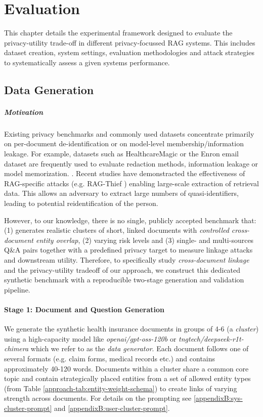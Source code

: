 \chapter{Evaluation}\label{chapter:evaluation}
This chapter details the experimental framework designed to evaluate the privacy-utility trade-off in different privacy-focussed \ac{RAG} systems. This includes dataset creation, system settings, evaluation methodologies and attack strategies to systematically assess a given systems performance.

\section{Data Generation}\label{evaluation-subsec:data-generation}
\paragraph{Motivation}
Existing privacy benchmarks and commonly used datasets concentrate primarily on per-document de-identification or on model-level membership/information leakage. For example, datasets such as HealthcareMagic or the Enron email dataset are frequently used to evaluate redaction methods, information leakage or model memorization. \cite{ragSAGE, ragThief, goodAndBad, proactivePrivAmnesiaLLM}. Recent studies have demonstracted the effectiveness of RAG-specific attacks (e.g. RAG-Thief \cite{ragThief}) enabling large-scale extraction of retrieval data. This allows an adversary to extract large numbers of quasi-identifiers, leading to potential reidentification of the person. \cite{simpleDemographic, netflixDeAnon} 

However, to our knowledge, there is no single, publicly accepted benchmark that: (1) generates realistic clusters of short, linked documents with \textit{controlled cross-document entity overlap}, (2) varying risk levels and (3) single- and multi-sources Q\&A pairs together with a predefined privacy target to measure linkage attacks and downstream utility. Therefore, to specifically study \textit{cross-document linkage} and the privacy-utility tradeoff of our approach, we construct this dedicated synthetic benchmark with a reproducible two-stage generation and validation pipeline. 

\subsubsection{Stage 1: Document and Question Generation}
We generate the synthetic health insurance documents in groups of 4-6 (a \textit{cluster}) using a high-capacity model like \textit{openai/gpt-oss-120b} or \textit{tngtech/deepseek-r1t-chimera} which we refer to as the \textit{data generator}. Each document follows one of several formats (e.g. claim forms, medical records etc.) and contains approximately 40-120 words. Documents within a cluster share a common core topic and contain strategically placed entities from a set of allowed entity types (from Table \ref{approach-tab:entity-weight-schema}) to create links of varying strength across documents. For details on the prompting see \ref{appendixB:sys-cluster-prompt} and \ref{appendixB:user-cluster-prompt}. 

